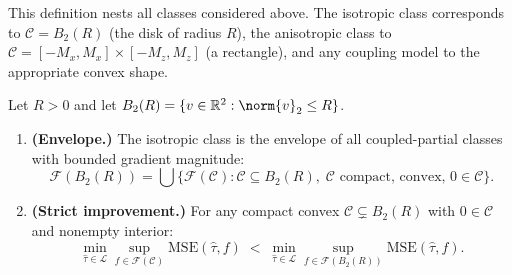 This definition nests all classes considered above.
The isotropic class corresponds to $\mathcal{C} = B_2(R)$ (the disk of radius $R$), the anisotropic class to $\mathcal{C} = [-M_x, M_x] \times [-M_z, M_z]$ (a rectangle), and any coupling model to the appropriate convex shape.

\begin{proposition}\label{prop:iso_envelope}
	Let $R > 0$ and let $B_2(R) = \{ v \in \mathbb{R}^2 : \norm{v}_2 \leq R \}$.
	\begin{enumerate}
		\item \textbf{(Envelope.)} The isotropic class is the envelope of all coupled-partial classes with bounded gradient magnitude:
		\begin{equation*}
			\mathcal{F}(B_2(R)) = \bigcup \bigl\{ \mathcal{F}(\mathcal{C}) : \mathcal{C} \subseteq B_2(R),\; \mathcal{C} \text{ compact, convex, } 0 \in \mathcal{C} \bigr\}.
		\end{equation*}
		\item \textbf{(Strict improvement.)} For any compact convex $\mathcal{C} \subsetneq B_2(R)$ with $0 \in \mathcal{C}$ and nonempty interior:
		\begin{equation*}
			\min_{\hat\tau \in \mathcal{L}} \sup_{f \in \mathcal{F}(\mathcal{C})} \mathrm{MSE}(\hat\tau, f) \;<\; \min_{\hat\tau \in \mathcal{L}} \sup_{f \in \mathcal{F}(B_2(R))} \mathrm{MSE}(\hat\tau, f).
		\end{equation*}
	\end{enumerate}
\end{proposition}

